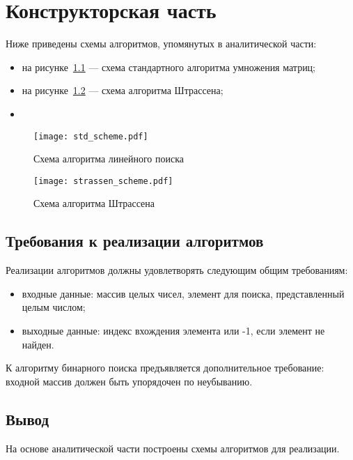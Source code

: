 \chapter{Конструкторская часть}

Ниже приведены схемы алгоритмов, упомянутых в аналитической части:
\begin{itemize}
	\item на рисунке~\ref{fig:std_scheme} --- схема стандартного алгоритма умножения матриц;
	\item на рисунке~\ref{fig:strassen_scheme} --- схема алгоритма Штрассена;
	\item 
\end{itemize}
\begin{figure}[H]
	\centering
	\texttt{[image: std\_scheme.pdf]}
	\caption{Схема алгоритма линейного поиска}
	\label{fig:std_scheme}
\end{figure}
\begin{figure}[H]
	\centering
	\texttt{[image: strassen\_scheme.pdf]}
	\caption{Схема алгоритма Штрассена}
	\label{fig:strassen_scheme}
\end{figure}
\section{Требования к реализации алгоритмов}

Реализации алгоритмов должны удовлетворять следующим общим требованиям:
\begin{itemize}[label=---]
	\item входные данные: массив целых чисел, элемент для поиска, представленный целым числом;
	\item выходные данные: индекс вхождения элемента или -1, если элемент не найден.
\end{itemize}

К алгоритму бинарного поиска предъявляется дополнительное требование: входной массив должен быть упорядочен по неубыванию.
\section*{Вывод}

На основе аналитической части построены схемы алгоритмов для реализации.

\clearpage